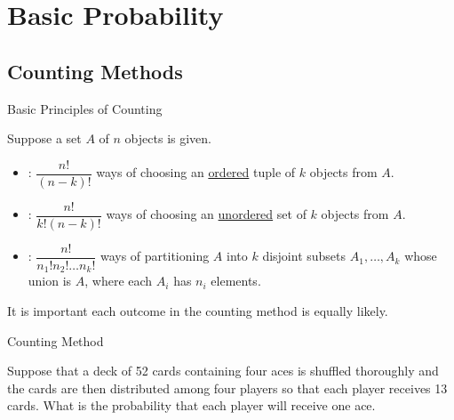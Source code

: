 \section{Basic Probability}

\subsection{Counting Methods}

\begin{frame}{Basic Principles of Counting}

\justifying
Suppose a set $A$ of $n$ objects is given.
\begin{itemize}
	\justifying
	\item {}: $\dfrac{n!}{(n-k)!}$ ways of choosing an \underline{ordered} tuple of $k$ objects from $A$.
	\item {}: $\dfrac{n!}{k!(n-k)!}$ ways of choosing an \underline{unordered} set of $k$ objects from $A$.
	\item {}: $\dfrac{n!}{n_1!n_2!\ldots n_k!}$ ways of partitioning $A$ into $k$ disjoint subsets $A_1, \ldots, A_k$ whose union is $A$, where each $A_i$ has $n_i$ elements.
\end{itemize}
 It is important each outcome in the counting method is equally likely.

\end{frame}

\begin{frame}{Counting Method}

\justifying
{} Suppose that a deck of 52 cards containing four aces is shuffled thoroughly and the cards are then distributed among four players so that each player receives 13 cards. What is the probability that each player will receive one ace. \\
~\\

\end{frame}

